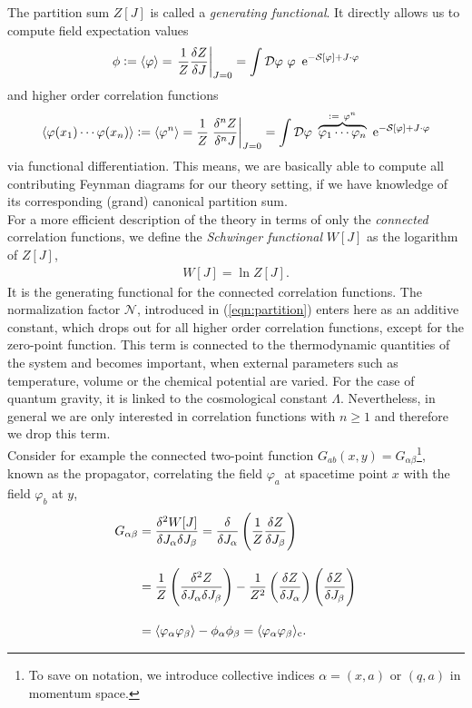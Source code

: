 The partition sum $Z[J]$ is called a \textit{generating functional}. It directly allows us to compute field expectation values
\begin{align}
	\phi := \cf{\varphi} = \eval{\frac{1}{Z}\frac{\delta Z}{\delta J}}_{J=0} = \int \D\varphi \ \varphi \ \operatorname{e}^{-\S + J\cdot\varphi}
\end{align}
and higher order correlation functions
\begin{align}
\cf{\varphi(x_1) \cdots \varphi(x_n)} := \cf{\varphi^n} = \frac{1}{Z}\eval{\frac{\delta^n Z}{\delta^n J}}_{J=0} = \int \D\varphi \ \overbrace{\varphi_1 \cdots \varphi_n}^{:= \ \varphi^n} \ \operatorname{e}^{-\S + J\cdot\varphi}
\end{align}
via functional differentiation. This means, we are basically able to compute all contributing Feynman diagrams for our theory setting, if we have knowledge of its corresponding (grand) canonical partition sum. \\
 For a more efficient description of the theory in terms of only the \textit{connected} correlation functions, we define the \textit{Schwinger functional} $W[J]$ as the logarithm of $Z[J]$,  
\begin{align}
W[J] = \ln Z[J].
\label{eqn:Schwinger}
\end{align}
It is the generating functional for the connected correlation functions. The normalization factor $\mathcal{N}$, introduced in (\ref{eqn:partition}) enters here as an additive constant, which drops out for all higher order correlation functions, except for the zero-point function. This term is connected to the thermodynamic quantities of the system and becomes important, when external parameters such as temperature, volume or the chemical potential are varied. For the case of quantum gravity, it is linked to the cosmological constant $\Lambda$. Nevertheless, in general we are only interested in correlation functions with $n\geq 1$ and therefore we drop this term.\\
Consider for example the connected two-point function $G_{ab}(x,y) = G_{\alpha\beta}$\footnote{To save on notation, we introduce collective indices $\alpha = (x,a)$ or $(q,a)$ in momentum space.}, known as the propagator, correlating the field $\varphi_a$ at spacetime point $x$ with the field $\varphi_b$ at $y$,
\begin{equation}
\begin{aligned}
	G_{\alpha\beta} &= \frac{\delta^2W[J]}{\delta J_{\alpha}\delta J_{\beta}} = \frac{\delta}{\delta J_{\alpha}}\left(\frac{1}{Z}\frac{\delta Z}{\delta J_{\beta}}\right)  \\[10pt]
				&= \frac{1}{Z}\left(\frac{\delta^2Z}{\delta J_{\alpha}\delta J_{\beta}}\right) - \frac{1}{Z^2}\left(\frac{\delta Z}{\delta J_{\alpha}}\right)\left(\frac{\delta Z}{\delta J_{\beta}}\right)\\[10pt]
				&= \langle \varphi_{\alpha}\varphi_{\beta} \rangle - \phi_{\alpha}\phi_{\beta} = \langle \varphi_{\alpha}\varphi_{\beta} \rangle_{\text{c}}. 
\end{aligned}
\label{eqn:G_connected}						
\end{equation}

